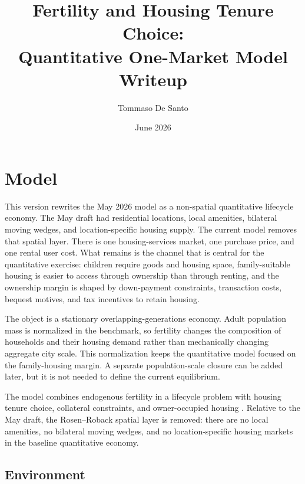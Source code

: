 \documentclass[11pt]{article}
\title{Fertility and Housing Tenure Choice:\\Quantitative One-Market Model Writeup}
\author{Tommaso De Santo}
\date{June 2026}
\begin{document}
\maketitle

\section{Model}

This version rewrites the May 2026 model as a non-spatial quantitative
lifecycle economy. The May draft had residential locations, local amenities,
bilateral moving wedges, and location-specific housing supply. The current
model removes that spatial layer. There is one housing-services market, one
purchase price, and one rental user cost. What remains is the channel that is
central for the quantitative exercise: children require goods and housing
space, family-suitable housing is easier to access through ownership than
through renting, and the ownership margin is shaped by down-payment constraints,
transaction costs, bequest motives, and tax incentives to retain housing.

The object is a stationary overlapping-generations economy. Adult population
mass is normalized in the benchmark, so fertility changes the composition of
households and their housing demand rather than mechanically changing aggregate
city scale. This normalization keeps the quantitative model focused on the
family-housing margin. A separate population-scale closure can be added later,
but it is not needed to define the current equilibrium.

The model combines endogenous fertility in a lifecycle problem
\citep{sommerFertilityChoiceLife2016,doepkeBargainingBabiesTheory2019} with
housing tenure choice, collateral constraints, and owner-occupied housing
\citep{hendersonModelHousingTenure1983,sommerEquilibriumEffectFundamentals2013,sommerImplicationsUSTax2018}.
Relative to the May draft, the Rosen--Roback spatial layer is removed: there
are no local amenities, no bilateral moving wedges, and no location-specific
housing markets in the baseline quantitative economy.

\subsection{Environment}
\end{document}
